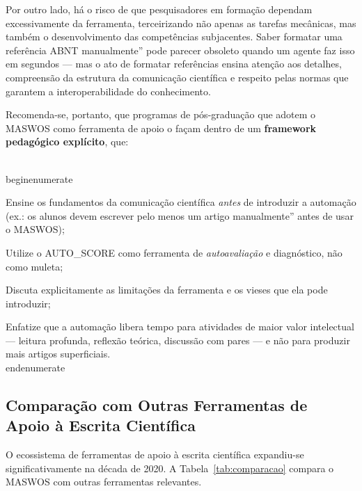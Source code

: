 Por outro lado, há o risco de que pesquisadores em formação
dependam excessivamente da ferramenta, terceirizando não apenas
as tarefas mecânicas, mas também o desenvolvimento das
competências subjacentes. Saber formatar uma referência ABNT
manualmente'' pode parecer obsoleto quando um agente faz isso
em segundos — mas o ato de formatar referências ensina atenção
aos detalhes, compreensão da estrutura da comunicação científica
e respeito pelas normas que garantem a interoperabilidade do
conhecimento.

Recomenda-se, portanto, que programas de pós-graduação que adotem
o MASWOS como ferramenta de apoio o façam dentro de um
\textbf{framework pedagógico explícito}, que:

\\begin{enumerate}
    \item Ensine os fundamentos da comunicação científica
    \textit{antes} de introduzir a automação (ex.: os alunos
    devem escrever pelo menos um artigo manualmente'' antes
    de usar o MASWOS);

    \item Utilize o AUTO\_SCORE como ferramenta de
    \textit{autoavaliação} e diagnóstico, não como muleta;

    \item Discuta explicitamente as limitações da ferramenta
    e os vieses que ela pode introduzir;

    \item Enfatize que a automação libera tempo para
    atividades de maior valor intelectual — leitura profunda,
    reflexão teórica, discussão com pares — e não para produzir
    mais artigos superficiais.
\\end{enumerate}

\subsection{Comparação com Outras Ferramentas de Apoio à Escrita Científica}
\label{sec:comparacao_ferramentas}

O ecossistema de ferramentas de apoio à escrita científica
expandiu-se significativamente na década de 2020. A
Tabela~\ref{tab:comparacao} compara o MASWOS com outras
ferramentas relevantes.

